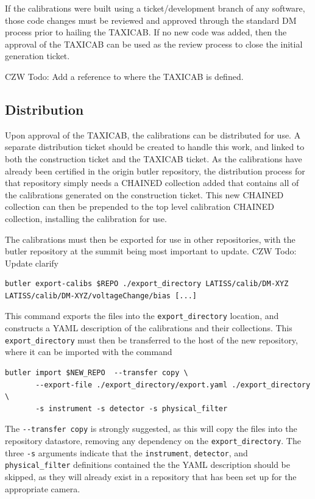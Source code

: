 \documentclass[DM,authoryear,toc]{lsstdoc}
\begin{document}
If the calibrations were built using a ticket/development branch of any software, those code changes must be reviewed and approved through the standard DM process prior to hailing the TAXICAB.  If no new code was added, then the approval of the TAXICAB can be used as the review process to close the initial generation ticket.

CZW Todo: Add a reference to where the TAXICAB is defined.

\subsection{Distribution}

Upon approval of the TAXICAB, the calibrations can be distributed for use.  A separate distribution ticket should be created to handle this work, and linked to both the construction ticket and the TAXICAB ticket.  As the calibrations have already been certified in the origin butler repository, the distribution process for that repository simply needs a CHAINED collection added that contains all of the calibrations generated on the construction ticket.  This new CHAINED collection can then be prepended to the top level calibration CHAINED collection, installing the calibration for use.

The calibrations must then be exported for use in other repositories, with the butler repository at the summit being most important to update. CZW Todo: Update clarify

\begin{verbatim}
butler export-calibs $REPO ./export_directory LATISS/calib/DM-XYZ LATISS/calib/DM-XYZ/voltageChange/bias [...]
\end{verbatim}

This command exports the files into the \verb|export_directory| location, and constructs a YAML description of the calibrations and their collections.  This \verb|export_directory| must then be transferred to the host of the new repository, where it can be imported with the command

\begin{verbatim}
butler import $NEW_REPO  --transfer copy \
       --export-file ./export_directory/export.yaml ./export_directory \
       -s instrument -s detector -s physical_filter
\end{verbatim}

The \verb|--transfer copy| is strongly suggested, as this will copy the files into the repository datastore, removing any dependency on the \verb|export_directory|.  The three \verb|-s| arguments indicate that the \verb|instrument|, \verb|detector|, and \verb|physical_filter| definitions contained the the YAML description should be skipped, as they will already exist in a repository that has been set up for the appropriate camera.
\end{document}
